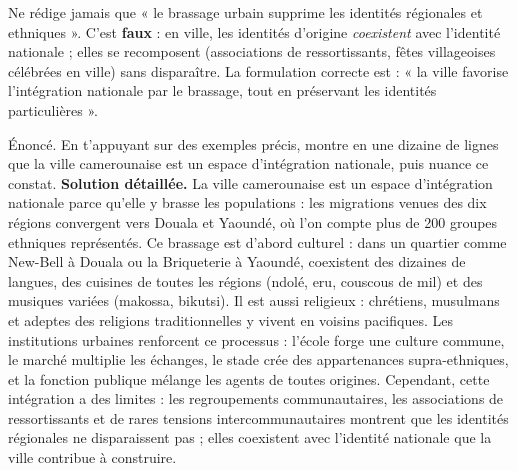 \documentclass[11pt]{article}
\begin{document}
\begin{attention}
Ne rédige jamais que « le brassage urbain supprime les identités régionales et ethniques ». C'est \textbf{faux} : en ville, les identités d'origine \emph{coexistent} avec l'identité nationale ; elles se recomposent (associations de ressortissants, fêtes villageoises célébrées en ville) sans disparaître. La formulation correcte est : « la ville favorise l'intégration nationale par le brassage, tout en préservant les identités particulières ».
\end{attention}

\begin{exoresolu}
Énoncé. En t'appuyant sur des exemples précis, montre en une dizaine de lignes que la ville camerounaise est un espace d'intégration nationale, puis nuance ce constat.
\tcblower
\textbf{Solution détaillée.} La ville camerounaise est un espace d'intégration nationale parce qu'elle y brasse les populations : les migrations venues des dix régions convergent vers Douala et Yaoundé, où l'on compte plus de 200 groupes ethniques représentés. Ce brassage est d'abord culturel : dans un quartier comme New-Bell à Douala ou la Briqueterie à Yaoundé, coexistent des dizaines de langues, des cuisines de toutes les régions (ndolé, eru, couscous de mil) et des musiques variées (makossa, bikutsi). Il est aussi religieux : chrétiens, musulmans et adeptes des religions traditionnelles y vivent en voisins pacifiques. Les institutions urbaines renforcent ce processus : l'école forge une culture commune, le marché multiplie les échanges, le stade crée des appartenances supra-ethniques, et la fonction publique mélange les agents de toutes origines. Cependant, cette intégration a des limites : les regroupements communautaires, les associations de ressortissants et de rares tensions intercommunautaires montrent que les identités régionales ne disparaissent pas ; elles coexistent avec l'identité nationale que la ville contribue à construire.
\end{exoresolu}
\end{document}
